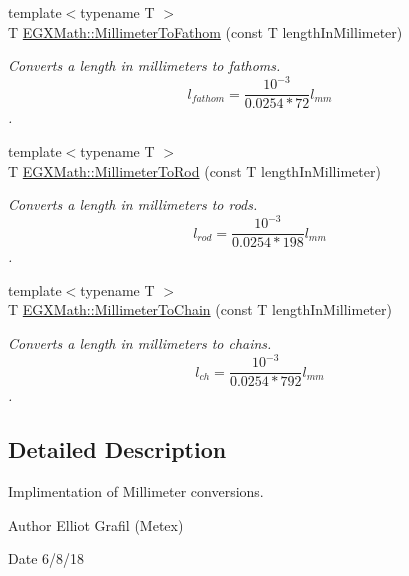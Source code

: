 \begin{DoxyCompactItemize}
{\footnotesize template$<$typename T $>$ }\\T \mbox{\hyperlink{group___e_g_x_math-_conversions-_length_conversions-_s_i-_millimeter-_nautical_ga1dce4ee3123e0132aae95bc9f7d0ac31}{E\+G\+X\+Math\+::\+Millimeter\+To\+Fathom}} (const T length\+In\+Millimeter)
\begin{DoxyCompactList}\small\item\em Converts a length in millimeters to fathoms. \[ l_{fathom}= \frac{10^{-3}}{0.0254 * 72} l_{mm} \]. \end{DoxyCompactList}\item 
{\footnotesize template$<$typename T $>$ }\\T \mbox{\hyperlink{group___e_g_x_math-_conversions-_length_conversions-_s_i-_millimeter-_surveyors_ga658a03332f16e17bdd23bd770091b221}{E\+G\+X\+Math\+::\+Millimeter\+To\+Rod}} (const T length\+In\+Millimeter)
\begin{DoxyCompactList}\small\item\em Converts a length in millimeters to rods. \[ l_{rod}= \frac{10^{-3}}{0.0254 * 198} l_{mm} \]. \end{DoxyCompactList}\item 
{\footnotesize template$<$typename T $>$ }\\T \mbox{\hyperlink{group___e_g_x_math-_conversions-_length_conversions-_s_i-_millimeter-_surveyors_gaacdbed15976b36734f17c99e024d96cd}{E\+G\+X\+Math\+::\+Millimeter\+To\+Chain}} (const T length\+In\+Millimeter)
\begin{DoxyCompactList}\small\item\em Converts a length in millimeters to chains. \[ l_{ch}= \frac{10^{-3}}{0.0254 * 792} l_{mm} \]. \end{DoxyCompactList}\end{DoxyCompactItemize}


\subsection{Detailed Description}
Implimentation of Millimeter conversions. 

\begin{DoxyAuthor}{Author}
Elliot Grafil (Metex) 
\end{DoxyAuthor}
\begin{DoxyDate}{Date}
6/8/18 
\end{DoxyDate}

